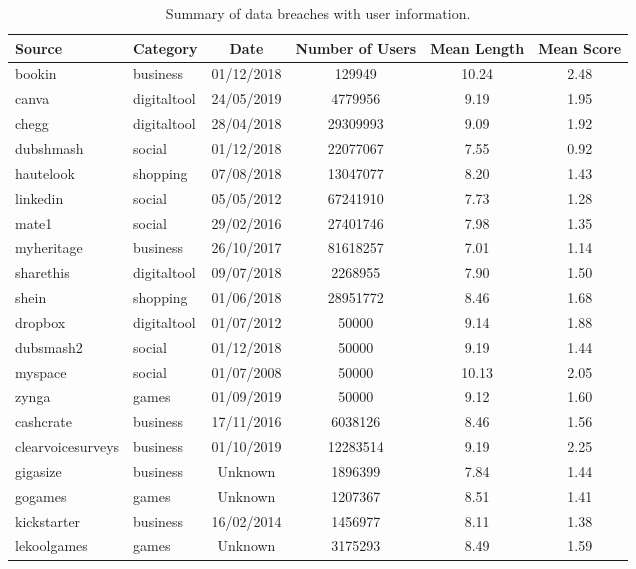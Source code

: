 \begin{table*}[h!]
\centering
\begin{tabular}{|l|l|c|c|c|c|}
\hline
\textbf{Source} & \textbf{Category} & \textbf{Date} & \textbf{Number of Users} & \textbf{Mean Length} & \textbf{Mean Score} \\
\hline
bookin & business & 01/12/2018  & 129949 & 10.24 & 2.48 \\
canva & digitaltool & 24/05/2019  & 4779956 & 9.19 & 1.95 \\
chegg & digitaltool & 28/04/2018  & 29309993 & 9.09 & 1.92 \\
dubshmash & social & 01/12/2018  & 22077067 & 7.55 & 0.92 \\
hautelook & shopping & 07/08/2018  & 13047077 & 8.20 & 1.43 \\
linkedin & social & 05/05/2012  & 67241910 & 7.73 & 1.28 \\
mate1 & social & 29/02/2016  & 27401746 & 7.98 & 1.35 \\
myheritage & business & 26/10/2017  & 81618257 & 7.01 & 1.14 \\
sharethis & digitaltool & 09/07/2018  & 2268955 & 7.90 & 1.50 \\
shein & shopping & 01/06/2018  & 28951772 & 8.46 & 1.68 \\
dropbox & digitaltool & 01/07/2012  & 50000 & 9.14 & 1.88 \\
dubsmash2 & social & 01/12/2018  & 50000 & 9.19 & 1.44 \\
myspace & social & 01/07/2008  & 50000 & 10.13 & 2.05 \\
zynga & games & 01/09/2019  & 50000 & 9.12 & 1.60 \\
cashcrate & business & 17/11/2016  & 6038126 & 8.46 & 1.56 \\
clearvoicesurveys & business & 01/10/2019  & 12283514 & 9.19 & 2.25 \\
gigasize & business & Unknown  & 1896399 & 7.84 & 1.44 \\
gogames & games & Unknown  & 1207367 & 8.51 & 1.41 \\
kickstarter & business & 16/02/2014  & 1456977 & 8.11 & 1.38 \\
lekoolgames & games & Unknown  & 3175293 & 8.49 & 1.59 \\
\hline
\end{tabular}
\caption{Summary of data breaches with user information.}
\end{table*}
